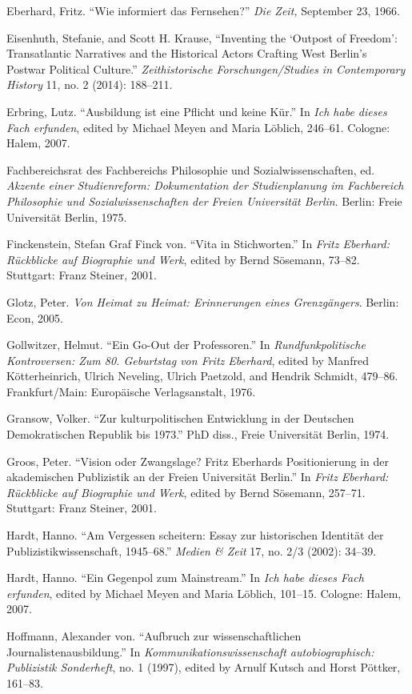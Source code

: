 \documentclass{tufte-handout}
\begin{document}
\begin{hangparas}{.25in}{1}
Eberhard, Fritz. ``Wie informiert das Fernsehen?'' \emph{Die Zeit,}
September 23, 1966.

Eisenhuth, Stefanie, and Scott H. Krause, ``Inventing the `Outpost of
Freedom': Transatlantic Narratives and the Historical Actors Crafting
West Berlin's Postwar Political Culture.'' \emph{Zeithistorische
Forschungen/Studies in Contemporary History} 11, no. 2 (2014): 188--211.

Erbring, Lutz. ``Ausbildung ist eine Pflicht und keine Kür.'' In
\emph{Ich habe dieses Fach erfunden}, edited by Michael Meyen and Maria
Löblich, 246--61. Cologne: Halem, 2007.

Fachbereichsrat des Fachbereichs Philosophie und Sozialwissenschaften,
ed. \emph{Akzente einer Studienreform: Dokumentation der Studienplanung
im Fachbereich Philosophie und Sozialwissenschaften der Freien
Universität Berlin}. Berlin: Freie Universität Berlin, 1975.

Finckenstein, Stefan Graf Finck von. ``Vita in Stichworten.'' In
\emph{Fritz Eberhard: Rückblicke auf Biographie und Werk}, edited by
Bernd Sösemann, 73--82. Stuttgart: Franz Steiner, 2001.

Glotz, Peter. \emph{Von Heimat zu Heimat: Erinnerungen eines
Grenzgängers}. Berlin: Econ, 2005.

Gollwitzer, Helmut. ``Ein Go-Out der Professoren.'' In
\emph{Rundfunkpolitische Kontroversen: Zum 80. Geburtstag von Fritz
Eberhard}, edited by Manfred Kötterheinrich, Ulrich Neveling, Ulrich
Paetzold, and Hendrik Schmidt, 479--86. Frankfurt/Main: Europäische
Verlagsanstalt, 1976.

Gransow, Volker. ``Zur kulturpolitischen Entwicklung in der Deutschen
Demokratischen Republik bis 1973.'' PhD diss., Freie Universität Berlin,
1974.

Groos, Peter. ``Vision oder Zwangslage? Fritz Eberhards Positionierung
in der akademischen Publizistik an der Freien Universität Berlin.'' In
\emph{Fritz Eberhard: Rückblicke auf Biographie und Werk}, edited by
Bernd Sösemann, 257--71. Stuttgart: Franz Steiner, 2001.

Hardt, Hanno. ``Am Vergessen scheitern: Essay zur historischen Identität
der Publizistikwissenschaft, 1945--68.'' \emph{Medien \& Zeit} 17, no.
2/3 (2002): 34--39.

Hardt, Hanno. ``Ein Gegenpol zum Mainstream.'' In \emph{Ich habe dieses
Fach erfunden}, edited by Michael Meyen and Maria Löblich, 101--15.
Cologne: Halem, 2007.

Hoffmann, Alexander von. ``Aufbruch zur wissenschaftlichen
Journalistenausbildung.'' In \emph{Kommunikationswissenschaft
autobiographisch:} \emph{Publizistik Sonderheft}, no. 1 (1997), edited
by Arnulf Kutsch and Horst Pöttker, 161--83.


\end{hangparas}
\end{document}

